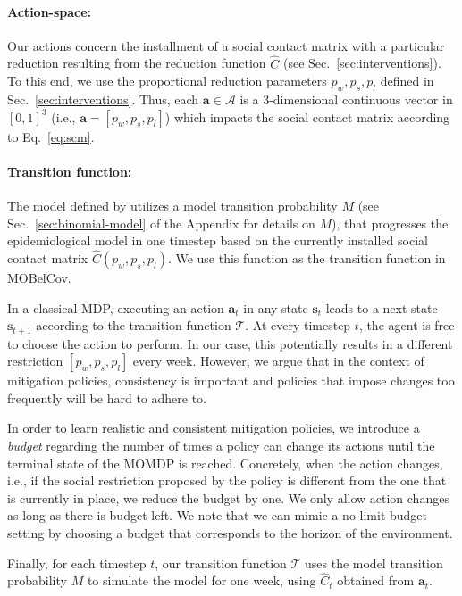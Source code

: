 \documentclass{article}
\newcommand{\mdpactionspace}{\mathcal{A}}
\newcommand{\mdptransition}{\mathcal{T}}
\newcommand{\mdpstate}{\mathbf{s}}
\newcommand{\mdpaction}{\mathbf{a}}
\newcommand{\momdpname}{MOBelCov}
\begin{document}
\paragraph{Action-space:} Our actions concern the installment of a social contact matrix with a particular reduction resulting from the reduction function $\hat{C}$ (see Sec.~\ref{sec:interventions}). To this end, we use the proportional reduction parameters $p_w, p_s, p_l$ defined in Sec.~\ref{sec:interventions}. Thus, each $\mdpaction \in \mdpactionspace$ is a 3-dimensional continuous vector in $[0,1]^3$ (i.e., $\mdpaction = [p_{w}, p_{s}, p_{l}]$) which impacts the social contact matrix according to Eq.~\ref{eq:scm}.

\paragraph{Transition function:} The model defined by \citet{abrams2021modelling} utilizes a model transition probability $M$ (see Sec.~\ref{sec:binomial-model} of the Appendix for details on $M$), that progresses the epidemiological model in one timestep based on the currently installed social contact matrix $\hat{C}(p_{w}, p_{s}, p_{l})$.
We use this function as the transition function in \momdpname.

In a classical MDP, executing an action $\mdpaction_t$ in any state $\mdpstate_t$ leads to a next state $\mdpstate_{t+1}$ according to the transition function $\mdptransition$. At every timestep $t$, the agent is free to choose the action to perform. In our case, this potentially results in a different restriction $[p_{w}, p_{s}, p_{l}]$ every week. However, we argue that in the context of mitigation policies, consistency is important and policies that impose changes too frequently will be hard to adhere to.

In order to learn realistic and consistent mitigation policies, we introduce a \emph{budget} regarding the number of times a policy can change its actions until the terminal state of the MOMDP is reached. Concretely, when the action changes, i.e., if the social restriction proposed by the policy is different from the one that is currently in place, we reduce the budget by one. We only allow action changes as long as there is budget left. We note that we can mimic a no-limit budget setting by choosing a budget that corresponds to the horizon of the environment.

Finally, for each timestep $t$, our transition function $\mdptransition$ uses the model transition probability $M$ to simulate the model for one week, using $\hat{C}_t$ obtained from $\mdpaction_t$.
\end{document}
